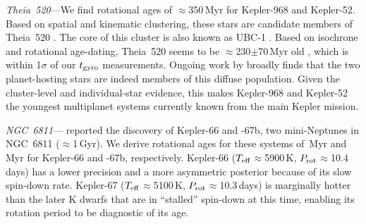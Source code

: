 \documentclass[11pt,twocolumn,tighten]{aastex63}
\begin{document}
{\it Theia~520}---We find rotational ages of $\approx$350\,Myr
for Kepler-968 and Kepler-52.  Based on spatial and kinematic
clustering, these stars are candidate 
members of Theia~520 \citep{2019AJ....158..122K}.  The core of this cluster is also known
as UBC-1 \citep{2018A&A...618A..59C}.  Based on isochrone and
rotational age-dating, Theia~520 seems to be
$\approx$230$\pm$70\,Myr old
\citep{2024A&A...681A..13F}, which is within
1$\sigma$ of our $t_{\rm gyro}$ measurements.  Ongoing work by
\citet{Curtis2024} broadly finds that the two planet-hosting stars are
indeed members of this diffuse population.  Given the cluster-level
and individual-star evidence, this makes Kepler-968 and Kepler-52 the
youngest multiplanet systems currently known from the main Kepler
mission.

{\it NGC~6811}---\citet{Meibom_2013} reported the discovery of
Kepler-66 and -67b, two mini-Neptunes in NGC~6811 ($\approx$1\,Gyr).
We derive rotational ages for these systems of
\kepsixsixtgyro\,Myr and \kepsixseventgyro\,Myr for Kepler-66 and
-67b, respectively.  Kepler-66 ($T_{\rm eff}$$\approx$5900\,K, $P_{\rm
rot}$$\approx$10.4\,days) has a lower precision and a more asymmetric
posterior because of its slow spin-down rate.  Kepler-67 ($T_{\rm
eff}$$\approx$5100\,K, $P_{\rm rot}$$\approx$10.3\,days) is marginally
hotter than the later K dwarfs that are in ``stalled'' spin-down at
this time, enabling its rotation period to be diagnostic of its age.
\end{document}
